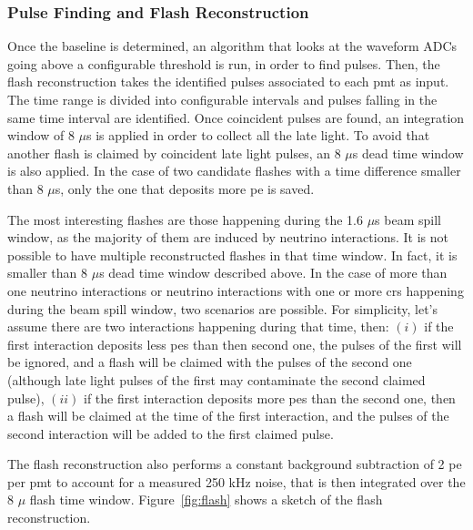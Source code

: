 \subsubsection*{Pulse Finding and Flash Reconstruction}

Once the baseline is determined, an algorithm that looks at the waveform ADCs going above a configurable threshold is run, in order to find pulses. Then, the flash reconstruction takes the identified pulses associated to each \acrshort{pmt} as input. The time range is divided into configurable intervals and pulses falling in the same time interval are identified. Once coincident pulses are found, an integration window of 8 $\mu$s is applied in order to collect all the late light. To avoid that another flash is claimed by coincident late light pulses, an 8 $\mu$s dead time window is also applied. In the case of two candidate flashes with a time difference smaller than 8 $\mu$s, only the one that deposits more \acrshort{pe} is saved.

The most interesting flashes are those happening during the 1.6 $\mu$s beam spill window, as the majority of them are induced by neutrino interactions. It is not possible to have multiple reconstructed flashes in that time window. In fact, it is smaller than 8 $\mu$s dead time window described above. In the case of more than one neutrino interactions or neutrino interactions with one or more \acrshort{cr}s happening during the beam spill window, two scenarios are possible. For simplicity, let's assume there are two interactions happening during that time, then: $(i)$ if the first interaction deposits less \acrshort{pe}s than then second one, the pulses of the first will be ignored, and a flash will be claimed with the pulses of the second one (although late light pulses of the first may contaminate the second claimed pulse), $(ii)$ if the first interaction deposits more \acrshort{pe}s than the second one, then a flash will be claimed at the time of the first interaction, and the pulses of the second interaction will be added to the first claimed pulse.  

The flash reconstruction also performs a constant background subtraction of 2 \acrshort{pe} per \acrshort{pmt} to account for a measured 250 kHz noise, that is then integrated over the 8 $\mu$ flash time window. Figure~\ref{fig:flash} shows a sketch of the flash reconstruction. 

